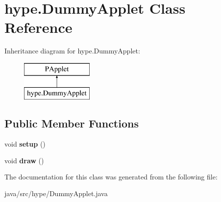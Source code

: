 \hypertarget{classhype_1_1_dummy_applet}{\section{hype.\-Dummy\-Applet Class Reference}
\label{classhype_1_1_dummy_applet}
}
Inheritance diagram for hype.\-Dummy\-Applet\-:\begin{figure}[H]
\begin{center}
\leavevmode
\includegraphics[height=2.000000cm]{classhype_1_1_dummy_applet}
\end{center}
\end{figure}
\subsection*{Public Member Functions}
\begin{DoxyCompactItemize}
\item 
\hypertarget{classhype_1_1_dummy_applet_a9946a84984ad63fafa311192f287f774}{void {\bfseries setup} ()}\label{classhype_1_1_dummy_applet_a9946a84984ad63fafa311192f287f774}

\item 
\hypertarget{classhype_1_1_dummy_applet_ab2fff6e68590777fb56246ecf6c5bf69}{void {\bfseries draw} ()}\label{classhype_1_1_dummy_applet_ab2fff6e68590777fb56246ecf6c5bf69}

\end{DoxyCompactItemize}


The documentation for this class was generated from the following file\-:\begin{DoxyCompactItemize}
\item 
java/src/hype/Dummy\-Applet.\-java\end{DoxyCompactItemize}

